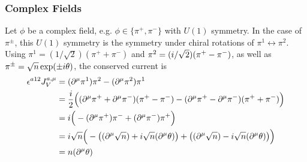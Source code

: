 \subsubsection{Complex Fields}

Let $\phi$ be a complex field, e.g. $\phi\in\{\pi^+,\pi^-\}$ with $U(1)$ symmetry. In the case of $\pi^\pm$, this $U(1)$ symmetry is the symmetry under chiral rotations of $\pi^1\leftrightarrow\pi^2$. Using $\pi^1=(1/\sqrt{2})(\pi^++\pi^-)$ and $\pi^2=({i}/\sqrt{2})(\pi^+-\pi^-)$, as well as $\pi^\pm=\sqrt{n}\exp(\pm{i}\theta)$, the conserved current is
\begin{align}
    \epsilon^{a12}J_V^{a,\mu}&=(\partial^\mu\pi^1)\pi^2-(\partial^\mu\pi^2)\pi^1\\
    &=\frac{{i}}{2}\Big((\partial^\mu\pi^++\partial^\mu\pi^-)(\pi^+-\pi^-)-(\partial^\mu\pi^+-\partial^\mu\pi^-)(\pi^++\pi^-)\Big)\\
    &={i}\Big(-(\partial^\mu\pi^+)\pi^-+(\partial^\mu\pi^-)\pi^+\Big)\\
    &={i}\sqrt{n}\Big(-\big((\partial^\mu\sqrt{n})+{i}\sqrt{n}(\partial^\mu\theta)\big)+\big((\partial^\mu\sqrt{n})-{i}\sqrt{n}(\partial^\mu\theta)\big)\Big)\\
    &=n(\partial^\mu\theta)
\end{align}

